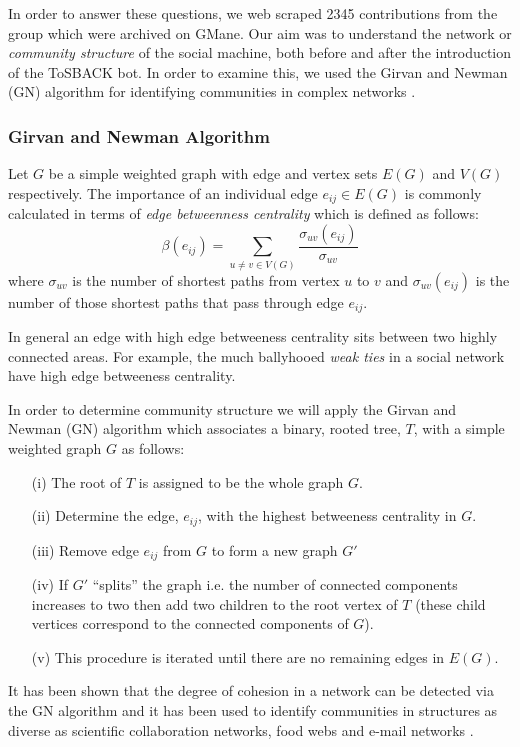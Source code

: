 \documentclass{sig-alternate}
\begin{document}
In order to answer these questions, we web scraped 2345 contributions from the group which were archived on GMane. Our aim was to understand the network or \emph{community structure} of the social machine, both before and after the introduction of the ToSBACK bot. In order to examine this, we used the Girvan and Newman (GN) algorithm for identifying communities in complex networks \cite{gnm:comm}.

\subsubsection{Girvan and Newman Algorithm}

Let $G$ be a simple weighted graph  with edge and vertex sets $E(G)$ and $V(G)$  respectively.  The importance of an individual edge $e_{ij} \in E(G)$ is commonly calculated in terms of \emph{edge betweenness centrality} which is defined as follows:
\[\beta(e_{ij}) = \sum_{ u\neq v \in V(G)} \frac{\sigma_{uv}(e_{ij})}{\sigma_{uv}}\]
where $\sigma_{uv}$ is the number of shortest paths from vertex $u$ to $v$ and $\sigma_{uv}(e_{ij})$ is the number of those shortest paths that pass through edge $e_{ij}$.  

In general an edge with high edge betweeness centrality sits between two highly connected areas.  For example, the much ballyhooed \emph{weak ties} in a social network have high edge betweeness centrality.

In order to determine community structure we will apply the Girvan and Newman (GN) algorithm \cite{gnm:comm} which associates a binary, rooted tree, $T$, with a simple weighted graph $G$ as follows: 
\begin{itemize}
\item[(i)] The root of $T$ is assigned to be the whole graph $G$.
 \item[(ii)] Determine the edge, $e_{ij}$, with the highest betweeness centrality in $G$.
 \item[(iii)] Remove edge $e_{ij}$ from $G$ to form  a new graph $G'$
 \item[(iv)] If $G'$ ``splits'' the graph i.e. the number of connected components increases to two then add two children to the root vertex of $T$ (these child vertices correspond to the connected components of $G$).
 \item[(v)] This procedure is iterated until there are no remaining edges in $E(G)$.
\end{itemize}

It has been shown \cite{gnm:comm} that the degree of cohesion in a network can be detected via the GN algorithm and it has been used to identify communities in structures as diverse as scientific collaboration networks, food webs and e-mail networks   \cite{gnm:comm,guimera:comm}.
\end{document}
